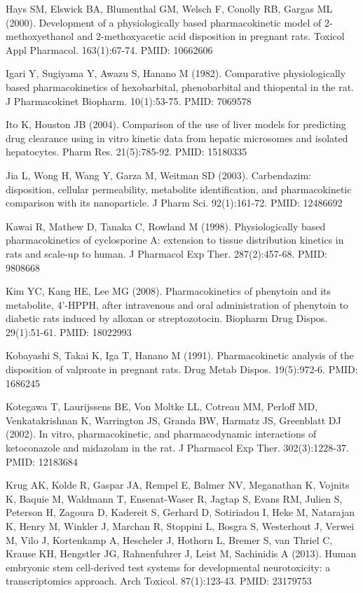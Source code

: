 \documentclass[a4paper]{book}
\begin{document}
\begin{References}
Hays SM, Elswick BA, Blumenthal GM, Welsch F, Conolly RB, Gargas ML (2000).
Development of a physiologically based pharmacokinetic model of
2-methoxyethanol and 2-methoxyacetic acid disposition in pregnant rats.
Toxicol Appl Pharmacol. 163(1):67-74. PMID: 10662606

Igari Y, Sugiyama Y, Awazu S, Hanano M (1982). Comparative physiologically
based pharmacokinetics of hexobarbital, phenobarbital and thiopental in the
rat. J Pharmacokinet Biopharm. 10(1):53-75. PMID: 7069578

Ito K, Houston JB (2004). Comparison of the use of liver models for
predicting drug clearance using in vitro kinetic data from hepatic
microsomes and isolated hepatocytes. Pharm Res. 21(5):785-92. PMID: 15180335

Jia L, Wong H, Wang Y, Garza M, Weitman SD (2003). Carbendazim: disposition,
cellular permeability, metabolite identification, and pharmacokinetic
comparison with its nanoparticle. J Pharm Sci. 92(1):161-72. PMID: 12486692

Kawai R, Mathew D, Tanaka C, Rowland M (1998). Physiologically based
pharmacokinetics of cyclosporine A: extension to tissue distribution
kinetics in rats and scale-up to human. J Pharmacol Exp Ther. 287(2):457-68.
PMID: 9808668

Kim YC, Kang HE, Lee MG (2008). Pharmacokinetics of phenytoin and its
metabolite, 4'-HPPH, after intravenous and oral administration of phenytoin
to diabetic rats induced by alloxan or streptozotocin. Biopharm Drug Dispos.
29(1):51-61. PMID: 18022993

Kobayashi S, Takai K, Iga T, Hanano M (1991). Pharmacokinetic analysis of
the disposition of valproate in pregnant rats. Drug Metab Dispos.
19(5):972-6. PMID: 1686245

Kotegawa T, Laurijssens BE, Von Moltke LL, Cotreau MM, Perloff MD,
Venkatakrishnan K, Warrington JS, Granda BW, Harmatz JS, Greenblatt DJ
(2002). In vitro, pharmacokinetic, and pharmacodynamic interactions of
ketoconazole and midazolam in the rat. J Pharmacol Exp Ther. 302(3):1228-37.
PMID: 12183684

Krug AK, Kolde R, Gaspar JA, Rempel E, Balmer NV, Meganathan K, Vojnits K,
Baquie M, Waldmann T, Ensenat-Waser R, Jagtap S, Evans RM, Julien S,
Peterson H, Zagoura D, Kadereit S, Gerhard D, Sotiriadou I, Heke M,
Natarajan K, Henry M, Winkler J, Marchan R, Stoppini L, Bosgra S, Westerhout
J, Verwei M, Vilo J, Kortenkamp A, Hescheler J, Hothorn L, Bremer S, van
Thriel C, Krause KH, Hengstler JG, Rahnenfuhrer J, Leist M, Sachinidis A
(2013). Human embryonic stem cell-derived test systems for developmental
neurotoxicity: a transcriptomics approach. Arch Toxicol. 87(1):123-43. PMID:
23179753


\end{References}
\end{document}
